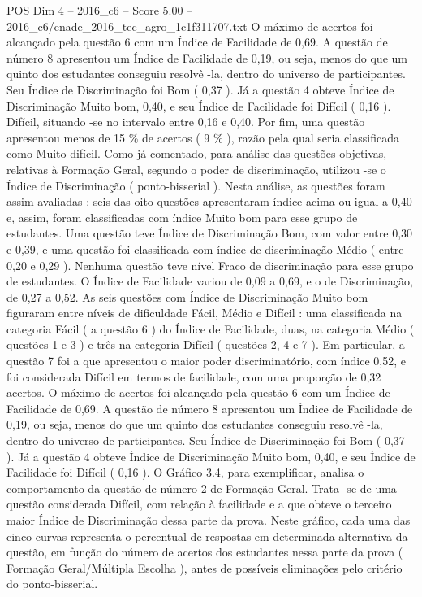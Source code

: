 \begin{textsample}{POS Dim 4 – 2016\_c6 – Score 5.00 – 2016\_c6/enade\_2016\_tec\_agro\_1c1f311707.txt}
O máximo de acertos foi alcançado pela questão 6 com um Índice de Facilidade de 0,69.
A questão de número 8 apresentou um Índice de Facilidade de 0,19, ou seja, menos do que um quinto dos estudantes conseguiu resolvê -la, dentro do universo de participantes.
Seu Índice de Discriminação foi Bom ( 0,37 ).
Já a questão 4 obteve Índice de Discriminação Muito bom, 0,40, e seu Índice de Facilidade foi Difícil ( 0,16 ).
Difícil, situando -se no intervalo entre 0,16 e 0,40.
Por fim, uma questão apresentou menos de 15 \% de acertos ( 9 \% ), razão pela qual seria classificada como Muito difícil.
Como já comentado, para análise das questões objetivas, relativas à Formação Geral, segundo o poder de discriminação, utilizou -se o Índice de Discriminação ( ponto-bisserial ).
Nesta análise, as questões foram assim avaliadas : seis das oito questões apresentaram índice acima ou igual a 0,40 e, assim, foram classificadas com índice Muito bom para esse grupo de estudantes.
Uma questão teve Índice de Discriminação Bom, com valor entre 0,30 e 0,39, e uma questão foi classificada com índice de discriminação Médio ( entre 0,20 e 0,29 ).
Nenhuma questão teve nível Fraco de discriminação para esse grupo de estudantes.
O Índice de Facilidade variou de 0,09 a 0,69, e o de Discriminação, de 0,27 a 0,52.
As seis questões com Índice de Discriminação Muito bom figuraram entre níveis de dificuldade Fácil, Médio e Difícil : uma classificada na categoria Fácil ( a questão 6 ) do Índice de Facilidade, duas, na categoria Médio ( questões 1 e 3 ) e três na categoria Difícil ( questões 2, 4 e 7 ).
Em particular, a questão 7 foi a que apresentou o maior poder discriminatório, com índice 0,52, e foi considerada Difícil em termos de facilidade, com uma proporção de 0,32 acertos.
O máximo de acertos foi alcançado pela questão 6 com um Índice de Facilidade de 0,69.
A questão de número 8 apresentou um Índice de Facilidade de 0,19, ou seja, menos do que um quinto dos estudantes conseguiu resolvê -la, dentro do universo de participantes.
Seu Índice de Discriminação foi Bom ( 0,37 ).
Já a questão 4 obteve Índice de Discriminação Muito bom, 0,40, e seu Índice de Facilidade foi Difícil ( 0,16 ).
O Gráfico 3.4, para exemplificar, analisa o comportamento da questão de número 2 de Formação Geral.
Trata -se de uma questão considerada Difícil, com relação à facilidade e a que obteve o terceiro maior Índice de Discriminação dessa parte da prova.
Neste gráfico, cada uma das cinco curvas representa o percentual de respostas em determinada alternativa da questão, em função do número de acertos dos estudantes nessa parte da prova ( Formação Geral/Múltipla Escolha ), antes de possíveis eliminações pelo critério do ponto-bisserial.

\end{textsample}
